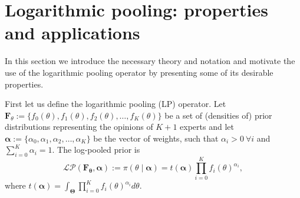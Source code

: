 \documentclass[a4paper, notitlepage, 10pt]{article}
\begin{document}
\section{Logarithmic pooling: properties and applications}
\label{sec:background}

In this section we introduce the necessary theory and notation and motivate the use of the logarithmic pooling operator by presenting some of its desirable properties.

First let us define the logarithmic pooling (LP) operator.
Let $\mathbf{F}_{\theta} := \{f_0(\theta), f_1(\theta), f_2(\theta), \ldots, f_K(\theta)\}$ be a set of (densities of) prior distributions representing the opinions of $K+1$ experts and let $\boldsymbol\alpha :=\{\alpha_0, \alpha_1, \alpha_2, \ldots, \alpha_K \}$ be the vector of weights, such that $\alpha_i > 0\: \forall i$ and $\sum_{i=0}^K \alpha_i = 1$.
The log-pooled prior is
\begin{equation}
\label{eq:logpool}
 \mathcal{LP}(\mathbf{F_\theta}, \boldsymbol\alpha) := \pi(\theta \mid \boldsymbol\alpha) = t(\boldsymbol\alpha) \prod_{i=0}^K f_i(\theta)^{\alpha_i},
\end{equation}
where $t(\boldsymbol\alpha) = \int_{\boldsymbol\Theta}\prod_{i=0}^K f_i(\theta)^{\alpha_i}d\theta$.
\end{document}
